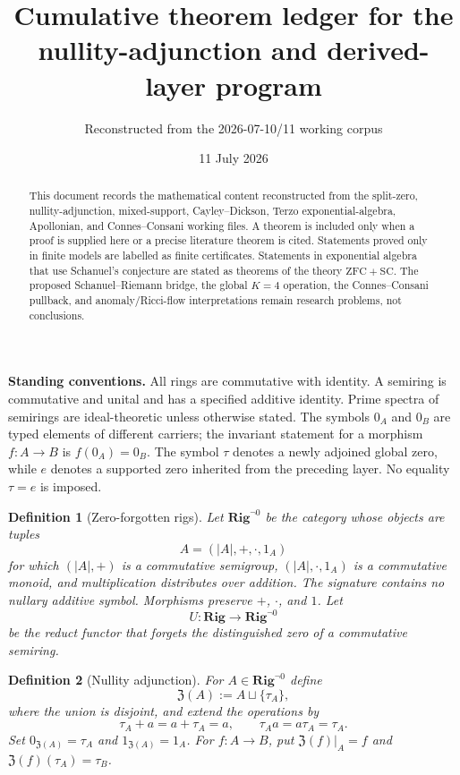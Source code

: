 \documentclass[11pt]{article}
\title{Cumulative theorem ledger for the nullity-adjunction and derived-layer program}
\author{Reconstructed from the 2026-07-10/11 working corpus}
\date{11 July 2026}
\newtheorem{definition}{Definition}
\begin{document}
\maketitle

\begin{abstract}
This document records the mathematical content reconstructed from the split-zero, nullity-adjunction, mixed-support, Cayley--Dickson, Terzo exponential-algebra, Apollonian, and Connes--Consani working files.  A theorem is included only when a proof is supplied here or a precise literature theorem is cited.  Statements proved only in finite models are labelled as finite certificates.  Statements in exponential algebra that use Schanuel's conjecture are stated as theorems of the theory $\mathrm{ZFC}+\mathrm{SC}$.  The proposed Schanuel--Riemann bridge, the global $K=4$ operation, the Connes--Consani pullback, and anomaly/Ricci-flow interpretations remain research problems, not conclusions.
\end{abstract}

\noindent\textbf{Standing conventions.}
All rings are commutative with identity.  A semiring is commutative and unital and has a specified additive identity.  Prime spectra of semirings are ideal-theoretic unless otherwise stated.  The symbols $0_A$ and $0_B$ are typed elements of different carriers; the invariant statement for a morphism $f:A\to B$ is $f(0_A)=0_B$.  The symbol $\tau$ denotes a newly adjoined global zero, while $e$ denotes a supported zero inherited from the preceding layer.  No equality $\tau=e$ is imposed.

\begin{definition}[Zero-forgotten rigs]
Let $\mathbf{Rig}^{\neg0}$ be the category whose objects are tuples
\[
A=(|A|,+,\cdot,1_A)
\]
for which $(|A|,+)$ is a commutative semigroup, $(|A|,\cdot,1_A)$ is a commutative monoid, and multiplication distributes over addition.  The signature contains no nullary additive symbol.  Morphisms preserve $+$, $\cdot$, and $1$.  Let
\[
U:\mathbf{Rig}\longrightarrow\mathbf{Rig}^{\neg0}
\]
be the reduct functor that forgets the distinguished zero of a commutative semiring.
\end{definition}

\begin{definition}[Nullity adjunction]
For $A\in\mathbf{Rig}^{\neg0}$ define
\[
\mathfrak Z(A):=A\sqcup\{\tau_A\},
\]
where the union is disjoint, and extend the operations by
\[
\tau_A+a=a+\tau_A=a,\qquad \tau_Aa=a\tau_A=\tau_A.
\]
Set $0_{\mathfrak Z(A)}=\tau_A$ and $1_{\mathfrak Z(A)}=1_A$.  For $f:A\to B$, put $\mathfrak Z(f)|_A=f$ and $\mathfrak Z(f)(\tau_A)=\tau_B$.
\end{definition}
\end{document}
